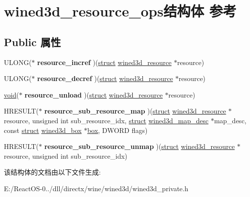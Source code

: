 \hypertarget{structwined3d__resource__ops}{}\section{wined3d\+\_\+resource\+\_\+ops结构体 参考}
\label{structwined3d__resource__ops}
\subsection*{Public 属性}
\begin{DoxyCompactItemize}
\item 
\mbox{\label{structwined3d__resource__ops_a3c4b73e440f223ee49c8e6bf37ff2ebd}} 
U\+L\+O\+NG($\ast$ {\bfseries resource\+\_\+incref} )(\hyperlink{interfacestruct}{struct} \hyperlink{structwined3d__resource}{wined3d\+\_\+resource} $\ast$resource)
\item 
\mbox{\label{structwined3d__resource__ops_ae5c0f0c46b0cddae88ff8f62f22e7385}} 
U\+L\+O\+NG($\ast$ {\bfseries resource\+\_\+decref} )(\hyperlink{interfacestruct}{struct} \hyperlink{structwined3d__resource}{wined3d\+\_\+resource} $\ast$resource)
\item 
\mbox{\label{structwined3d__resource__ops_a0cb49e040c4b9756087e76a65237e882}} 
\hyperlink{interfacevoid}{void}($\ast$ {\bfseries resource\+\_\+unload} )(\hyperlink{interfacestruct}{struct} \hyperlink{structwined3d__resource}{wined3d\+\_\+resource} $\ast$resource)
\item 
\mbox{\label{structwined3d__resource__ops_a73edcd324b2a462798795caff2dc7661}} 
H\+R\+E\+S\+U\+LT($\ast$ {\bfseries resource\+\_\+sub\+\_\+resource\+\_\+map} )(\hyperlink{interfacestruct}{struct} \hyperlink{structwined3d__resource}{wined3d\+\_\+resource} $\ast$resource, unsigned int sub\+\_\+resource\+\_\+idx, \hyperlink{interfacestruct}{struct} \hyperlink{structwined3d__map__desc}{wined3d\+\_\+map\+\_\+desc} $\ast$map\+\_\+desc, const \hyperlink{interfacestruct}{struct} \hyperlink{structwined3d__box}{wined3d\+\_\+box} $\ast$\hyperlink{structbox}{box}, D\+W\+O\+RD flags)
\item 
\mbox{\label{structwined3d__resource__ops_a13edd10f0d4ece95c087006203e07956}} 
H\+R\+E\+S\+U\+LT($\ast$ {\bfseries resource\+\_\+sub\+\_\+resource\+\_\+unmap} )(\hyperlink{interfacestruct}{struct} \hyperlink{structwined3d__resource}{wined3d\+\_\+resource} $\ast$resource, unsigned int sub\+\_\+resource\+\_\+idx)
\end{DoxyCompactItemize}


该结构体的文档由以下文件生成\+:\begin{DoxyCompactItemize}
\item 
E\+:/\+React\+O\+S-\/0../dll/directx/wine/wined3d/wined3d\+\_\+private.\+h\end{DoxyCompactItemize}
